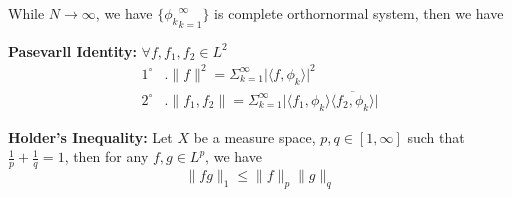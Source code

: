 \documentclass{Math_Note}
\begin{document}
While $N \to \infty$, we have $\{{\phi_{k}}_{k=1}^{\infty}\}$ is complete orthornormal system, then we have

\begin{thm}[Tech]
    \textbf{Pasevarll Identity:} $\forall f, f_{1},f_{2} \in L^{2}$
    \begin{equation}
        \begin{aligned}
            1^{\circ}&. \parallel{f}\parallel^{2} = \Sigma_{k=1}^{\infty}\lvert{\langle f,\phi_{k} \rangle}\rvert^{2} \\
            2^{\circ}&. \parallel{f_{1},f_{2}}\parallel = \Sigma_{k=1}^{\infty}\lvert{\langle f_{1},\phi_{k} \rangle}\overline{\langle f_{2},\phi_{k} \rangle}\rvert
        \end{aligned}
    \end{equation}
\end{thm}

\begin{thm}[Tech]
    \textbf{Holder's Inequality:} Let $X$ be a measure space, $p, q \in [1, \infty]$ such that $\frac{1}{p} + \frac{1}{q} = 1$, then for any $f, g \in L^{p}$, we have
    \begin{equation}
        \parallel{fg}\parallel_{1} \leq \parallel{f}\parallel_{p}\parallel{g}\parallel_{q}
    \end{equation}
\end{thm}
\end{document}
